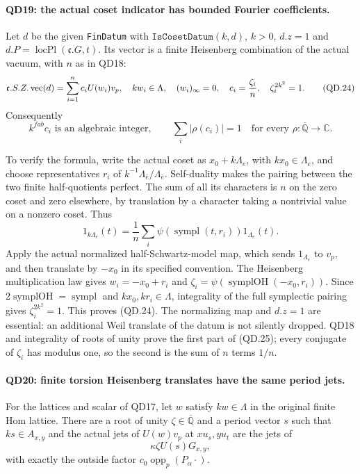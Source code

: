 \paragraph{QD19: the actual coset indicator has bounded Fourier coefficients.}
Let $d$ be the given \texttt{FinDatum} with
$\texttt{IsCosetDatum}(k,d)$, $k>0$, $d.z=1$ and
$d.P=\operatorname{locPl}(\mathfrak c.G,t)$.
Its vector is a finite Heisenberg combination of the actual
vacuum, with $n$ as in QD18:
\[
       \mathfrak c.S.Z.\operatorname{vec}(d)
                   =\sum_{i=1}^n c_i U(w_i)v_p,
 \quad kw_i\in\Lambda,\quad(w_i)_\infty=0,
 \quad c_i={\zeta_i\over n},\quad\zeta_i^{2k^2}=1.        \tag{QD.24}
\]
Consequently
\[
 k^{f a b}c_i\text{ is an algebraic integer},\qquad
       \sum_i|\rho(c_i)|=1
       \quad\text{for every }\rho:\overline{\mathbb Q}\to\mathbb C.
                                                               \tag{QD.25}
\]

To verify the formula, write the actual coset as $x_0+k\Lambda_e$,
with $kx_0\in\Lambda_e$, and choose representatives $r_i$ of
$k^{-1}\Lambda_{\bar e}/\Lambda_{\bar e}$.  Self-duality makes
the pairing between the two finite half-quotients perfect.
The sum of all its characters is $n$ on the zero coset and
zero elsewhere, by translation by a character taking a nontrivial
value on a nonzero coset.  Thus
\[
 1_{k\Lambda_e}(t)=\frac1n\sum_i
              \psi(\operatorname{sympl}(t,r_i))1_{\Lambda_e}(t).
                                                               \tag{QD.26}
\]
Apply the actual normalized half-Schwartz-model map, which sends
$1_{\Lambda_e}$ to $v_p$, and then translate by $-x_0$ in its
specified convention.  The Heisenberg multiplication law gives
$w_i=-x_0+r_i$ and
$\zeta_i=\psi(\operatorname{symplOH}(-x_0,r_i))$.
Since $2\operatorname{symplOH}=\operatorname{sympl}$ and
$kx_0,kr_i\in\Lambda$, integrality of the full symplectic
pairing gives $\zeta_i^{2k^2}=1$.  This proves (QD.24).
The normalizing map and $d.z=1$ are essential: an additional
Weil translate of the datum is not silently dropped.  QD18
and integrality of roots of unity prove the first part of
(QD.25); every conjugate of $\zeta_i$ has modulus one, so the
second is the sum of $n$ terms $1/n$.

\paragraph{QD20: finite torsion Heisenberg translates have the same period jets.}
For the lattices and scalar of QD17, let $w$ satisfy $kw\in\Lambda$
in the original finite Hom lattice.  There are a root of unity
$\zeta\in\overline{\mathbb Q}$ and a period vector $s$ such that
$ks\in A_{x,y}$ and the actual jets of $U(w)v_p$ at $xu_s,yu_t$
are the jets of
\[
                         \kappa\zeta U(s)G_{x,y},         \tag{QD.27}
\]
with exactly the outside factor $c_0\operatorname{opp}_p(P_\alpha\cdot)$.

